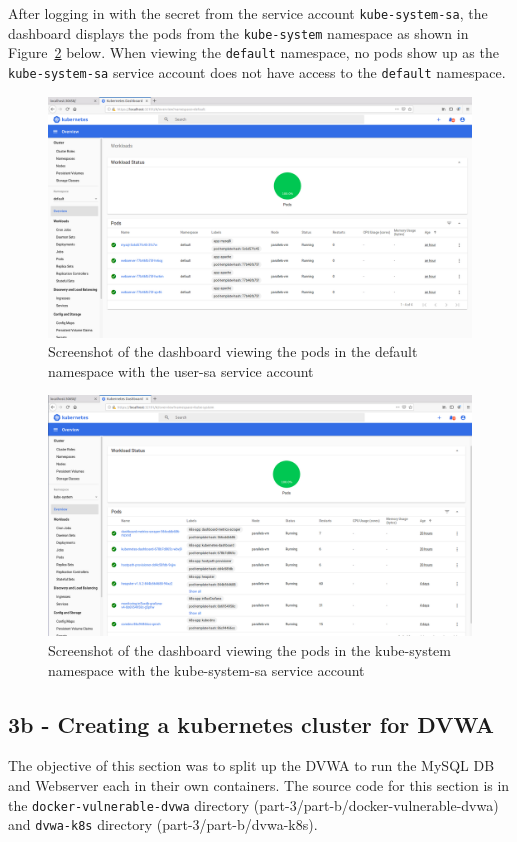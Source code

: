 \documentclass[11pt]{article}
\begin{document}
After logging in with the secret from the service account \verb|kube-system-sa|,
the dashboard displays the pods from the \verb|kube-system| namespace as shown in Figure~\ref{fig:dashboard-kube} below. 
When viewing the \verb|default| namespace, no pods show up as the \verb|kube-system-sa| service account does not have access to the \verb|default| namespace.
\begin{figure}[htbp]
  \centering
  \includegraphics[width=.9\linewidth]{./dashboard-def.png}
  \caption{\label{fig:dashboard-def}
  Screenshot of the dashboard viewing the pods in the default namespace with the user-sa service account}
\end{figure}
\begin{figure}[htbp]
  \centering
  \includegraphics[width=.9\linewidth]{./dashboard-kube.png}
  \caption{\label{fig:dashboard-kube}
    Screenshot of the dashboard viewing the pods in the kube-system namespace with the kube-system-sa service account}
\end{figure}

\newpage
\subsection*{3b - Creating a kubernetes cluster for DVWA}
The objective of this section was to split up the DVWA to run the MySQL DB and Webserver each in their own containers.
The source code for this section is in the \verb|docker-vulnerable-dvwa| directory (part-3/part-b/docker-vulnerable-dvwa) and \verb|dvwa-k8s| directory (part-3/part-b/dvwa-k8s).
\end{document}
